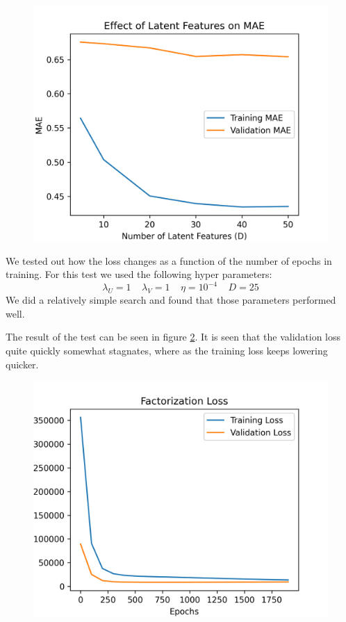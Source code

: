 \documentclass{article}
\begin{document}
\begin{figure}[H]
    \centering
    \includegraphics[scale = 0.7]{latent_features_MAE.png}
    \caption{}
    \label{fig:LatentPlot}
\end{figure}

We tested out how the loss changes as a function of the number of epochs in training. For this test we used the following hyper parameters:
$$\lambda_U = 1 \;\;\;\; \lambda_V = 1 \;\;\;\; \eta=10^{-4} \;\;\;\; D=25$$
We did a relatively simple search and found that those parameters performed well.

The result of the test can be seen in figure \ref{fig:LossPlot}. It is seen that the validation loss quite quickly somewhat stagnates, where as the training loss keeps lowering quicker.

\begin{figure}[H]
    \centering
    \includegraphics[scale = 0.7]{loss.png}
    \caption{}
    \label{fig:LossPlot}
\end{figure}
\end{document}
